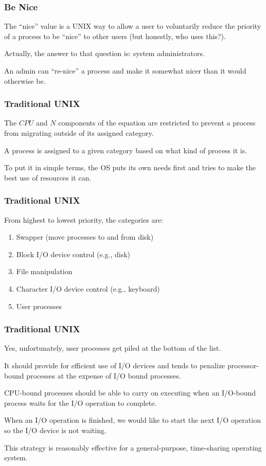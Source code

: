 \begin{frame}
\frametitle{Be Nice}

The ``nice'' value is a UNIX way to allow a user to voluntarily reduce the priority of a process to be ``nice'' to other users (but honestly, who uses this?).

Actually, the answer to that question is: system administrators. 

An admin can ``re-nice'' a process and make it somewhat nicer than it would otherwise be.


\end{frame}

\begin{frame}
\frametitle{Traditional UNIX}

The $CPU$ and $N$ components of the equation are restricted to prevent a process from migrating outside of its assigned category. 

A process is assigned to a given category based on what kind of process it is. 

To put it in simple terms, the OS puts its own needs first and tries to make the best use of resources it can.


\end{frame}

\begin{frame}
\frametitle{Traditional UNIX}

From highest to lowest priority, the categories are:

\begin{enumerate}
	\item Swapper (move processes to and from disk)
	\item Block I/O device control (e.g., disk)
	\item File manipulation
	\item Character I/O device control (e.g., keyboard)
	\item User processes
\end{enumerate}



\end{frame}

\begin{frame}
\frametitle{Traditional UNIX}

Yes, unfortunately, user processes get piled at the bottom of the list. 

It should provide for efficient use of I/O devices and tends to penalize processor-bound processes at the expense of I/O bound processes. 

CPU-bound processes should be able to carry on executing when an I/O-bound process waits for the I/O operation to complete. 

When an I/O operation is finished, we would like to start the next I/O operation so the I/O device is not waiting.

This strategy is reasonably effective for a general-purpose, time-sharing operating system.

\end{frame}

